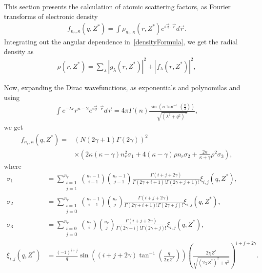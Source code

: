  This section presents the calculation of atomic scattering factors, as Fourier
    transforms of electronic density
  \begin{align}
    f_{n_r,\kappa}(q,Z^*) = \int \rho_{n_r,\kappa} (r,Z^*) e^{i
    \vec{q} \cdot \vec{r}} d \vec{r}. \label{eq:40}
  \end{align}
  Integrating out the angular dependence in~\eqref{densityFormula}, we get the
  radial density as
  \begin{align}
    \rho (r,Z^*) = \sum_{\lambda}
    |g_{\lambda}(r,Z^*)|^2+|f_{\lambda}(r,Z^*)|^2, \label{eq:39}
  \end{align}
  
  Now, expanding the Dirac wavefunctions, as exponentials and polynomilas and using \cite{gradstejn_table_2009}
  \begin{align}
    \int e^{-\lambda r}r^{n-2} e^{i \vec{q} \cdot \vec{r}} d\vec{r} =
    4\pi \Gamma(n) \frac{\sin(n
    \tan^{-1}(\frac{q}{\lambda}))}{\sqrt{(\lambda^2+q^2)^n}},
    \label{eq:42}
  \end{align}
  we get
  \begin{align}
    f_{n_r,\kappa}(q,Z^*)=& (N(2\gamma+1)\Gamma(2\gamma))^2 \nonumber
    \\
     &\times \left(
    2\kappa (\kappa-\gamma) n_r^2\sigma_1 + 4(\kappa-\gamma) \rho n_r
    \sigma_2 +
    \frac{2\kappa}{\kappa+\gamma}\rho^2\sigma_3\right), \label{eq:41}
  \end{align}
  where
  \begin{align*}
    \sigma_{1}
    &= \sum_{\substack{i=1\\j=1}}^{n_r} {{n_r-1}\choose{i-1}}
    {{n_r-1}\choose{j-1}}
    \frac{\Gamma(i+j+2\gamma)}{\Gamma(2\gamma+i+1)!
    \Gamma(2\gamma+j+1)!} \xi_{i,j}(q,Z^*),
    \\
    \sigma_{2}
    &= \sum_{\substack{i=1\\j=0}}^{n_r} {{n_r-1}\choose{i-1}}
    {{n_r}\choose{j}} \frac{\Gamma(i+j+2\gamma)}{\Gamma(2\gamma+i+1)!
    \Gamma(2\gamma+j)!} \xi_{i,j}(q,Z^*),
    \\
    \sigma_{3}
    &= \sum_{\substack{i=0\\j=0}}^{n_r} {{n_r}\choose{i}}
    {{n_r}\choose{j}}
    \frac{\Gamma(i+j+2\gamma)}{\Gamma(2\gamma+i)!\Gamma(2\gamma+j)!}
    \xi_{i,j}(q,Z^*),
    \\
    \xi_{i,j}(q,Z^*)
    &= \frac{(-1)^{i+j}}{q} \sin\left((i+j+2\gamma)
      \tan^{-1}\left(\frac{q}{2\chi Z^*}\right)\right) \left(\frac{2
      \chi Z^*}{\sqrt{(2\chi Z^*)^2+q^2}}\right)^{i+j+2\gamma}.
  \end{align*}
  

